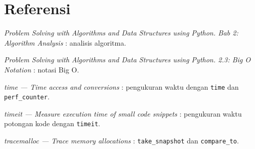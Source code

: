 \section*{Referensi}
\begin{daftarrapat}
  \item \textit{Problem Solving with Algorithms and Data Structures using Python. Bab 2: Algorithm Analysis} \cite{pythonds-analysis}: analisis algoritma.
  \item \textit{Problem Solving with Algorithms and Data Structures using Python. 2.3: Big O Notation} \cite{pythonds-bigo}: notasi Big O.
  \item \textit{time — Time access and conversions} \cite{py-time}: pengukuran waktu dengan \texttt{time} dan \texttt{perf\_counter}.
  \item \textit{timeit — Measure execution time of small code snippets} \cite{py-timeit}: pengukuran waktu potongan kode dengan \texttt{timeit}.
  \item \textit{tracemalloc — Trace memory allocations} \cite{py-tracemalloc}: \texttt{take\_snapshot} dan \texttt{compare\_to}.
\end{daftarrapat}
